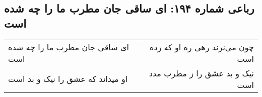 \begin{center}
\section*{رباعی شماره ۱۹۴: ای ساقی جان مطرب ما را چه شده است}
\label{sec:0194}
\begin{longtable}{l p{0.5cm} r}
ای ساقی جان مطرب ما را چه شده است
&&
چون می‌نزند رهی ره او که زده است
\\
او میداند که عشق را نیک و بد است
&&
نیک و بد عشق را ز مطرب مدد است
\\
\end{longtable}
\end{center}
